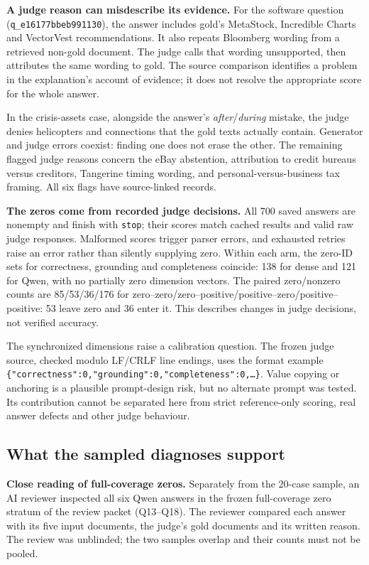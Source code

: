 \textbf{A judge reason can misdescribe its evidence.}
For the software question (\texttt{q\_e16177bbeb991130}), the answer includes
gold's MetaStock, Incredible Charts and VectorVest recommendations.
It also repeats Bloomberg wording from a retrieved non-gold document.
The judge calls that wording unsupported, then attributes the same wording to
gold. The source comparison identifies a problem in the explanation's account
of evidence; it does not resolve the appropriate score for the whole answer.

In the crisis-assets case, alongside the answer's
\emph{after}/\emph{during} mistake, the judge denies
helicopters and connections that the gold texts actually contain.
Generator and judge errors coexist: finding one does not erase the other.
The remaining flagged judge reasons concern the eBay abstention, attribution
to credit bureaus versus creditors, Tangerine timing wording, and
personal-versus-business tax framing. All six flags have source-linked records.

\textbf{The zeros come from recorded judge decisions.}
All 700 saved answers are nonempty and finish with \texttt{stop}; their scores
match cached results and valid raw judge responses.
Malformed scores trigger parser errors, and exhausted retries raise an error
rather than silently supplying zero. Within each arm, the zero-ID sets for
correctness, grounding and completeness coincide: 138 for dense and 121 for
Qwen, with no partially zero dimension vectors.
The paired zero/nonzero counts are 85/53/36/176 for
zero--zero/zero--positive/positive--zero/positive--positive: 53 leave zero and
36 enter it. This describes changes in judge decisions, not verified accuracy.

The synchronized dimensions raise a calibration question.
The frozen judge source, checked modulo LF/CRLF line endings, uses the format
example \texttt{\{"correctness":0,"grounding":0,"completeness":0,\ldots\}}.
Value copying or anchoring is a plausible prompt-design risk, but no alternate
prompt was tested. Its contribution cannot be separated here from strict
reference-only scoring, real answer defects and other judge behaviour.

\subsection{What the sampled diagnoses support}

\textbf{Close reading of full-coverage zeros.}
Separately from the 20-case sample, an AI reviewer inspected all six Qwen
answers in the frozen full-coverage zero stratum of the review packet
(Q13--Q18). The reviewer compared each answer with its five input documents,
the judge's gold documents and its written reason. The review was unblinded;
the two samples overlap and their counts must not be pooled.

